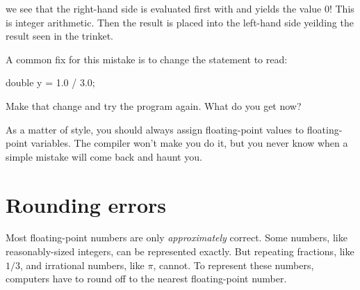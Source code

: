 we see that the right-hand side  is evaluated first with and yields the value 0!  This is integer arithmetic.
Then the result is placed into the left-hand side yeilding the result seen in the trinket.

A common fix for this mistake is to change the statement to read:
\begin{code}
double y = 1.0 / 3.0; 
\end{code}

Make that change and try the program again.  What do you get now?

%



%
%

As a matter of style, you should always assign floating-point values to floating-point variables.
The compiler won't make you do it, but you never know when a simple mistake will come back and haunt you.


\section{Rounding errors}


Most floating-point numbers are only {\em approximately} correct.
Some numbers, like reasonably-sized integers, can be represented exactly.
But repeating fractions, like $1/3$, and irrational numbers, like $\pi$, cannot.
To represent these numbers, computers have to round off to the nearest floating-point number.

